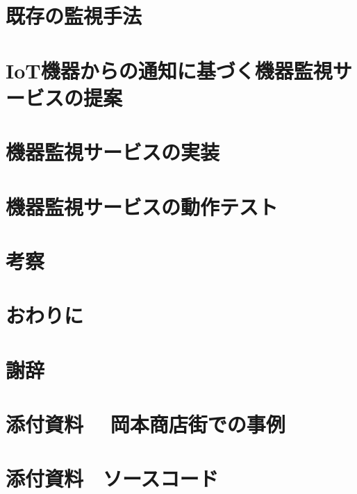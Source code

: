 \documentclass[a4paper]{jreport}
\begin{document}
\chapter{既存の監視手法}

\chapter{IoT機器からの通知に基づく機器監視サービスの提案}

\chapter{機器監視サービスの実装}

\chapter{機器監視サービスの動作テスト}


\chapter{考察}


\chapter{おわりに}


\chapter*{謝辞}




\chapter*{添付資料　 岡本商店街での事例}


\chapter*{添付資料　ソースコード}


\begin{comment}
\chapter*{添付資料　エージェントプログラム用インターフェース　ソースコード
\addcontentsline{toc}{chapter}{添付資料3　エージェントプログラム用インターフェース　ソースコード}

\chapter*{添付資料　Webアプリケーション　ソースコード}
\addcontentsline{toc}{chapter}{添付資料4　Webアプリケーション　ソースコード}
\end{comment}
\end{document}

